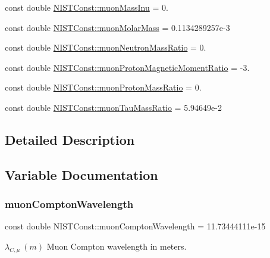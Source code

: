 \begin{DoxyCompactItemize}
\item 
const double \hyperlink{group___muon_gaa24722892f878b56a8aa97cca27ed908}{N\+I\+S\+T\+Const\+::muon\+Mass\+Inu} = 0.
\item 
const double \hyperlink{group___muon_ga9211251167ca5318354df60b44939e60}{N\+I\+S\+T\+Const\+::muon\+Molar\+Mass} = 0.\+1134289257e-\/3
\item 
const double \hyperlink{group___muon_ga8f63813d3e0283a611f3e66b6d0b681d}{N\+I\+S\+T\+Const\+::muon\+Neutron\+Mass\+Ratio} = 0.
\item 
const double \hyperlink{group___muon_gae49d53271e3ee71dc74d718028782d06}{N\+I\+S\+T\+Const\+::muon\+Proton\+Magnetic\+Moment\+Ratio} = -\/3.
\item 
const double \hyperlink{group___muon_ga72ca5408215ae40bb36ef1bff9107cf7}{N\+I\+S\+T\+Const\+::muon\+Proton\+Mass\+Ratio} = 0.
\item 
const double \hyperlink{group___muon_gaaf24aa0c43f6d4a1935963fdd4c44789}{N\+I\+S\+T\+Const\+::muon\+Tau\+Mass\+Ratio} = 5.\+94649e-\/2
\end{DoxyCompactItemize}


\subsection{Detailed Description}


\subsection{Variable Documentation}
\mbox{\label{group___muon_ga344399a1ac3bc2f57614ccdca4f4f1c1}} 
\subsubsection{\texorpdfstring{muon\+Compton\+Wavelength}{muonComptonWavelength}}
{\footnotesize\ttfamily const double N\+I\+S\+T\+Const\+::muon\+Compton\+Wavelength = 11.\+73444111e-\/15}

$\lambda_{C,\mu} \ (m)$ Muon Compton wavelength in meters. \mbox{\label{group___muon_ga4a55b49a126bc1f308e50dfa6869cd76}} 
